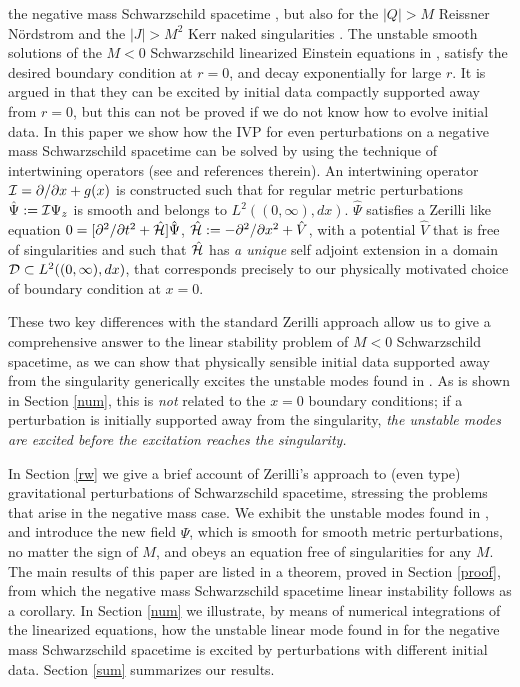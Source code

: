 \documentclass[aps,floats,showpacs,amssymb,tightenlines]{revtex4}
\def\p{\partial}
\def\I{{\cal I}}
\begin{document}
 the negative mass Schwarzschild spacetime \cite{dg}, but also for the $|Q|>M$ Reissner N\"ordstrom 
 and the $|J| >M^2$ Kerr naked singularities \cite{dgp,dgsv}.
The unstable smooth solutions of the $M<0$ Schwarzschild 
 linearized Einstein equations in \cite{dg}, satisfy the desired
boundary condition at $r=0$, and decay exponentially  for large $r$.
It is  argued  in \cite{dg} 
that they can be excited  by initial data  compactly supported
away from $r=0$, but this can not be proved if we do not know how to evolve initial data.
In this paper we show how the IVP for  even
perturbations on a negative mass Schwarzschild spacetime can be solved by using the technique of intertwining operators
 (see \cite{price} and references therein).
An intertwining operator $\I= \p/\p x + g(x)$ is constructed such that for
 regular metric perturbations $\hat \Psi := \I \Psi_z $
is smooth and belongs to
$L^2((0,\infty),dx)$.
$\hat \Psi$ satisfies a Zerilli like equation $0= [\p^2 /\p t^2 +\hat {\cal H} ] \hat \Psi$, $\hat {\cal H} :=
 - \p^2/\p x^2 + \hat V$,
with a potential $\hat V$ that is  free of  singularities and such that $\hat {\cal H}$ has  {\em a unique}
self adjoint extension in a domain ${\cal D} \subset L^2((0,\infty),dx)$, that corresponds precisely
 to our physically motivated choice of boundary condition at $x=0$.

These two key differences with the standard Zerilli approach allow us to give a
 comprehensive answer to the linear stability problem
of $M<0$ Schwarzschild spacetime, as we can show that physically sensible initial
 data supported away from the singularity generically
excites the unstable modes found in \cite{dg}. As is shown in Section \ref{num}, 
this is {\em not} related to the $x=0$ boundary
conditions; if a perturbation is initially supported away
 from the singularity, {\em the unstable modes are excited before the excitation reaches the singularity.}

In Section \ref{rw} we give a brief account of Zerilli's approach to (even type)
 gravitational perturbations of Schwarzschild spacetime, stressing the problems that
 arise in the negative mass case. We exhibit the unstable modes found in \cite{dg}, 
and introduce the new field $\hat { \Psi}$, which is smooth for smooth metric perturbations, 
no matter the sign of $M$, and obeys an equation free of  singularities
for any  $M$.
The main results of this paper are listed in a theorem, proved in Section \ref{proof}, from which 
 the negative mass Schwarzschild spacetime linear instability follows as a corollary.
In Section \ref{num} we illustrate, by means of numerical integrations of the
 linearized equations, how the unstable linear mode found in \cite{dg} for the
 negative mass Schwarzschild spacetime is excited by  perturbations with different initial data.
Section \ref{sum} summarizes our results.
\end{document}
